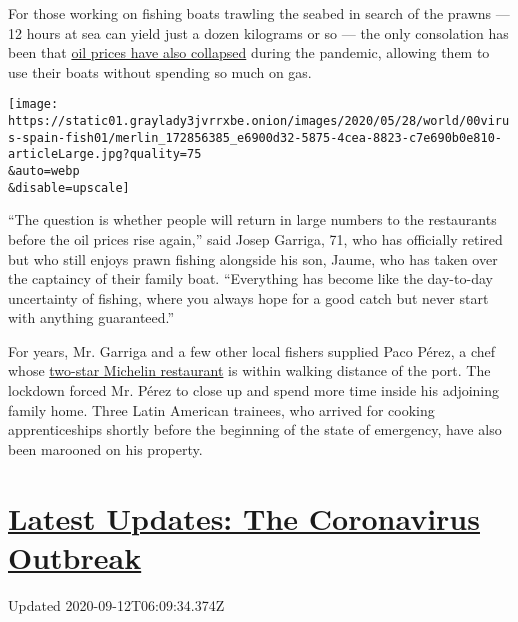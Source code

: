 For those working on fishing boats trawling the seabed in search of the
prawns --- 12 hours at sea can yield just a dozen kilograms or so ---
the only consolation has been that
\href{https://www.nytimes3xbfgragh.onion/2020/03/31/business/energy-environment/crude-oil-companies-coronavirus.html}{oil
prices have also collapsed} during the pandemic, allowing them to use
their boats without spending so much on gas.

\texttt{[image: https://static01.graylady3jvrrxbe.onion/images/2020/05/28/world/00virus-spain-fish01/merlin\_172856385\_e6900d32-5875-4cea-8823-c7e690b0e810-articleLarge.jpg?quality=75\\\&auto=webp\\\&disable=upscale]}

``The question is whether people will return in large numbers to the
restaurants before the oil prices rise again,'' said Josep Garriga, 71,
who has officially retired but who still enjoys prawn fishing alongside
his son, Jaume, who has taken over the captaincy of their family boat.
``Everything has become like the day-to-day uncertainty of fishing,
where you always hope for a good catch but never start with anything
guaranteed.''

For years, Mr. Garriga and a few other local fishers supplied Paco
Pérez, a chef whose
\href{http://restaurantmiramar.com/es/paco-perez/}{two-star Michelin
restaurant} is within walking distance of the port. The lockdown forced
Mr. Pérez to close up and spend more time inside his adjoining family
home. Three Latin American trainees, who arrived for cooking
apprenticeships shortly before the beginning of the state of emergency,
have also been marooned on his property.

\hypertarget{latest-updates-the-coronavirus-outbreak}{%
\section{\texorpdfstring{\href{https://www.nytimes3xbfgragh.onion/2020/09/11/world/covid-19-coronavirus.html?action=click\&pgtype=Article\&state=default\&region=MAIN_CONTENT_1\&context=storylines_live_updates}{Latest
Updates: The Coronavirus
Outbreak}}{Latest Updates: The Coronavirus Outbreak}}\label{latest-updates-the-coronavirus-outbreak}}

Updated 2020-09-12T06:09:34.374Z

